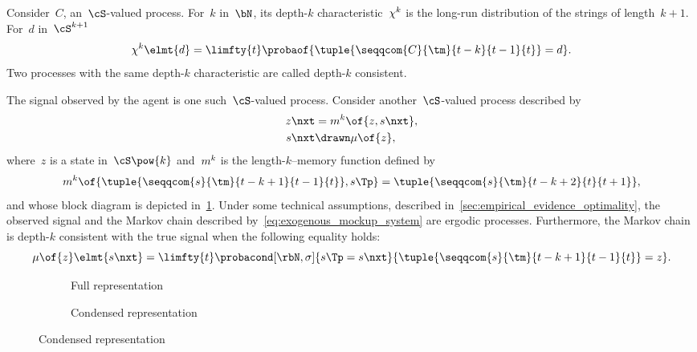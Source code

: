 Consider~\(C\), an~\(\cS\)-valued process.
For~\(k\) in~\(\bN\), its depth-\(k\) characteristic~\(\chi^k\) is the long-run distribution of the strings of length~\(k + 1\).
For~\(d\) in~\(\cS^{k + 1}\)
\begin{equation*}
\chi\K\elmt{d} = \limfty{t} \probaof{\tuple{\seqqcom{C}{\tm}{t - k}{t - 1}{t}} = d}.
\end{equation*}
Two processes with the same depth-\(k\) characteristic are called depth-\(k\) consistent.


The signal observed by the agent is one such~\(\cS\)-valued process.
Consider another~\(\cS\)-valued process described by
\begin{subequations}
\label{eq:exogenous_mockup_system}
\begin{align}
\label{eq:exogenous_mockup_model}
z\nxt &= m\K \of{z, s\nxt}, \\
\label{eq:exogenous_mockup_predictor}
s\nxt &\drawn \mu \of{z},
\end{align}
\end{subequations}
where~\(z\) is a state in~\(\cS\pow{k}\) and~\(m^k\) is the length-\(k\)--memory function defined by
\[
m\K \of{\tuple{\seqqcom{s}{\tm}{t - k + 1}{t - 1}{t}}, s\Tp} = \tuple{\seqqcom{s}{\tm}{t - k + 2}{t}{t + 1}},
\]
and whose block diagram is depicted in~\cref{fig:block_diagram_mockup_exploded}.
Under some technical assumptions, described in~\cref{sec:empirical_evidence_optimality}, the observed signal and the Markov chain described by~\cref{eq:exogenous_mockup_system} are ergodic processes.
Furthermore, the Markov chain is depth-\(k\) consistent with the true signal when the following equality holds:
\[
\mu \of{z} \elmt{s\nxt} = \limfty{t}\probacond[\rbN, \sigma]{s\Tp = s\nxt}{\tuple{\seqqcom{s}{\tm}{t - k+ 1}{t - 1}{t}} = z}.
\]

\begin{figure}[htp]
\begin{subfigure}[b]{0.5\textwidth}
\centering
{}
\caption{Full representation}
\end{subfigure}%
\begin{subfigure}[b]{0.5\textwidth}
\centering
{}
\caption{Condensed representation}
\end{subfigure}
\label{fig:block_diagram_mockup_exploded}
\end{figure}

